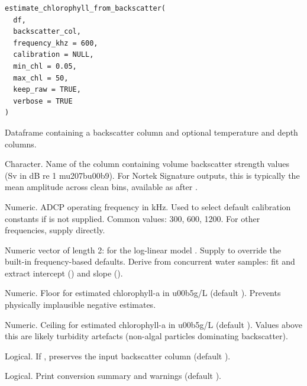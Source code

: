 \documentclass[a4paper]{book}
\begin{document}
%
\begin{Usage}
\begin{verbatim}
estimate_chlorophyll_from_backscatter(
  df,
  backscatter_col,
  frequency_khz = 600,
  calibration = NULL,
  min_chl = 0.05,
  max_chl = 50,
  keep_raw = TRUE,
  verbose = TRUE
)
\end{verbatim}
\end{Usage}
%
\begin{Arguments}
\begin{ldescription}
\item[\code{df}] Dataframe containing a backscatter column and optional temperature
and depth columns.

\item[\code{backscatter\_col}] Character. Name of the column containing volume
backscatter strength values (Sv in dB re 1 m\bsl{}u207b\bsl{}u00b9). For Nortek Signature
outputs, this is typically the mean amplitude across clean bins, available
as  after .

\item[\code{frequency\_khz}] Numeric. ADCP operating frequency in kHz. Used to
select default calibration constants if  is not supplied.
Common values: 300, 600, 1200. For other frequencies, supply 
directly.

\item[\code{calibration}] Numeric vector of length 2:  for the log-linear
model . Supply to override the built-in
frequency-based defaults. Derive from concurrent water samples:
fit  and extract intercept () and
slope ().

\item[\code{min\_chl}] Numeric. Floor for estimated chlorophyll-a in \bsl{}u00b5g/L
(default ). Prevents physically implausible negative estimates.

\item[\code{max\_chl}] Numeric. Ceiling for estimated chlorophyll-a in \bsl{}u00b5g/L
(default ). Values above this are likely turbidity artefacts (non-algal
particles dominating backscatter).

\item[\code{keep\_raw}] Logical. If , preserves the input backscatter column
(default ).

\item[\code{verbose}] Logical. Print conversion summary and warnings (default ).
\end{ldescription}
\end{Arguments}
\end{document}
